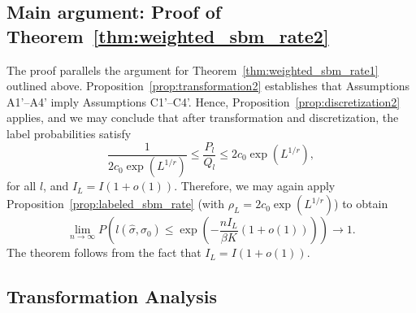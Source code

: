 \documentclass{article}
\begin{document}
\subsection{Main argument: Proof of Theorem~\ref{thm:weighted_sbm_rate2}}
\label{AppThmRate2}

The proof parallels the argument for Theorem~\ref{thm:weighted_sbm_rate1} outlined above. Proposition~\ref{prop:transformation2} establishes that Assumptions A1'--A4' imply Assumptions C1'--C4'. Hence, Proposition~\ref{prop:discretization2} applies, and we may conclude that after transformation and discretization, the label probabilities satisfy 
\[
\frac{1}{2c_0 \exp(L^{1/r})} \leq \frac{P_l}{Q_l} \leq 2c_0 \exp(L^{1/r}),
\]
for all $l$, and $I_L = I(1+o(1))$. Therefore, we may again apply Proposition~\ref{prop:labeled_sbm_rate} (with $\rho_L = 2 c_0 \exp(L^{1/r})$) to obtain
\[
\lim_{n \rightarrow \infty} P \left( l(\hat{\sigma}, \sigma_0) \leq \exp \left( - \frac{ n I_L}{ \beta K} (1 + o(1)) \right) \right) \rightarrow 1.
\]
The theorem follows from the fact that $I_L = I(1+o(1))$. 

\subsection{Transformation Analysis}
\end{document}
